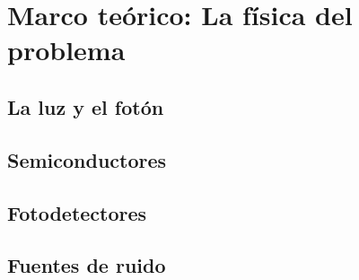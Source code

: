 \chapter{Marco teórico: La física del problema }
\section{La luz y el fotón}
\section{Semiconductores}
\section{Fotodetectores}
\section{Fuentes de ruido}
